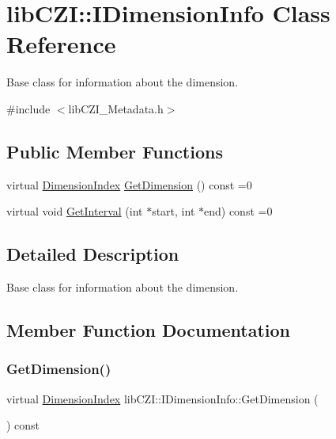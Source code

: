 \hypertarget{classlib_c_z_i_1_1_i_dimension_info}{}\section{lib\+C\+ZI\+:\+:I\+Dimension\+Info Class Reference}
\label{classlib_c_z_i_1_1_i_dimension_info}


Base class for information about the dimension.  




{\ttfamily \#include $<$lib\+C\+Z\+I\+\_\+\+Metadata.\+h$>$}

\subsection*{Public Member Functions}
\begin{DoxyCompactItemize}
\item 
virtual \hyperlink{namespacelib_c_z_i_a55049658acf59d0eddfaebcad16df424}{Dimension\+Index} \hyperlink{classlib_c_z_i_1_1_i_dimension_info_a3aef5c6762b0142fc2665d342e939a9d}{Get\+Dimension} () const =0
\item 
virtual void \hyperlink{classlib_c_z_i_1_1_i_dimension_info_a2e04b30f6e8877c3ae080b01e5ff994e}{Get\+Interval} (int $\ast$start, int $\ast$end) const =0
\end{DoxyCompactItemize}


\subsection{Detailed Description}
Base class for information about the dimension. 

\subsection{Member Function Documentation}
\mbox{\label{classlib_c_z_i_1_1_i_dimension_info_a3aef5c6762b0142fc2665d342e939a9d}} 
\subsubsection{\texorpdfstring{Get\+Dimension()}{GetDimension()}}
{\footnotesize\ttfamily virtual \hyperlink{namespacelib_c_z_i_a55049658acf59d0eddfaebcad16df424}{Dimension\+Index} lib\+C\+Z\+I\+::\+I\+Dimension\+Info\+::\+Get\+Dimension (\begin{DoxyParamCaption}{ }\end{DoxyParamCaption}) const\hspace{0.3cm}{\ttfamily [pure virtual]}}

